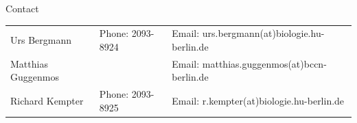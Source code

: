 \documentclass[12pt]{article}
\begin{document}

\vfill
\centerline{\CAP Contact}
\CAP

\begin{tabular}{lll}
Urs Bergmann & Phone: 2093-8924 & Email:
urs.bergmann(at)biologie.hu-berlin.de \\
Matthias Guggenmos & & Email: matthias.guggenmos(at)bccn-berlin.de \\
Richard Kempter \hfill & Phone: 2093-8925 \hfill & Email:
r.kempter(at)biologie.hu-berlin.de \\
\end{tabular}
\end{document}
